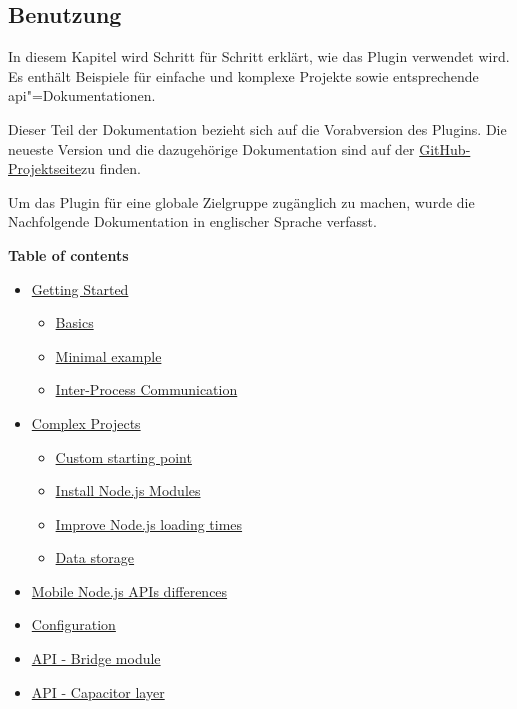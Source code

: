 \subsection{Benutzung}

In diesem Kapitel wird Schritt für Schritt erklärt, wie das Plugin verwendet wird.
Es enthält Beispiele für einfache und komplexe Projekte sowie entsprechende \acs{api}"=Dokumentationen.

Dieser Teil der Dokumentation bezieht sich auf die Vorabversion  des Plugins.
Die neueste Version und die dazugehörige Dokumentation sind auf der \href{https://github.com/hampoelz/Capacitor-NodeJS}{GitHub-Projektseite}\footnotemark[0] zu finden.

Um das Plugin für eine globale Zielgruppe zugänglich zu machen, wurde die Nachfolgende Dokumentation in englischer Sprache verfasst.


\textbf{Table of contents}

\begin{itemize}
    \setlength\itemsep{-1em}
    \item \hyperref[sec:Capacitor-NodeJS:GettingStarted]{Getting Started}
    \vspace{\itemsep}
    \begin{itemize}
        \setlength\itemsep{-1em}
        \item \hyperref[sec:Capacitor-NodeJS:Basics]{Basics}
        \item \hyperref[sec:Capacitor-NodeJS:MinimalExample]{Minimal example}
        \item \hyperref[sec:Capacitor-NodeJS:InterprocessCommunication]{Inter-Process Communication}
    \end{itemize}
    \item \hyperref[sec:Capacitor-NodeJS:ComplexProjects]{Complex Projects}
    \vspace{\itemsep}
    \begin{itemize}
        \setlength\itemsep{-1em}
        \item \hyperref[sec:Capacitor-NodeJS:CustomStartingPoint]{Custom starting point}
        \item \hyperref[sec:Capacitor-NodeJS:InstallModules]{Install Node.js Modules}
        \item \hyperref[sec:Capacitor-NodeJS:ImproveLoadingTimes]{Improve Node.js loading times}
        \item \hyperref[sec:Capacitor-NodeJS:ManualRuntimeStart]{Data storage}
    \end{itemize}
    \item \hyperref[sec:Capacitor-NodeJS:MobileAPIDifferences]{Mobile Node.js APIs differences}
    \item \hyperref[sec:Capacitor-NodeJS:Configuration]{Configuration}
    \item \hyperref[sec:Capacitor-NodeJS:API_BridgeModule]{API - Bridge module}
    \item \hyperref[sec:Capacitor-NodeJS:API_CapacitorLayer]{API - Capacitor layer}
\end{itemize}

